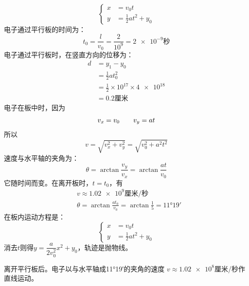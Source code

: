 ~\vspace{-1em}
\begin{equation*}
    \left\lbrace \begin{aligned}
        x & =v_0 t               \\
        y & =\frac{1}{2}at^2+y_0
    \end{aligned}\right.
\end{equation*}
电子通过平行板的时间为：
\begin{equation*}
    t_0=\frac{l}{v_0}=\frac{2}{10^{9}}=\num{2e-9}\text{秒}
\end{equation*}
电子通过平行板时，在竖直方向的位移为：
\begin{align*}
    d & =y_1-y_0                                     \\
      & =\frac{1}{2}at_0^2                           \\
      & =\frac{1}{2}\times 10^{17} \times \num{4e18} \\
      & =0.2\text{厘米}
\end{align*}
电子在板中时，因为\vspace{-0.5em}
\begin{equation*}
    v_x=v_0 \qquad v_y=at \\
\end{equation*}
所以\vspace{-1em}
\begin{equation*}
    v=\sqrt{v_x^2+v_y^2}=\sqrt{v_0^2 + a^2 t^2}
\end{equation*}
速度与水平轴的夹角为：
\begin{equation*}
    \theta = \arctan\frac{v_y}{v_x} = \arctan\frac{at}{v_0}
\end{equation*}
它随时间而变。在离开板时，$t=t_0$，有
\begin{align*}
     & v \approx \num{1.02e9}\text{厘米/秒}                           \\
     & \theta = \arctan\frac{at_0}{v_0} =\arctan\frac 1 5=\ang{11;19;}
\end{align*}
在板内运动方程是：
\begin{equation*}
    \left\lbrace \begin{aligned}
        x & =v_0 t               \\
        y & =\frac{1}{2}at^2+y_0
    \end{aligned}\right.
\end{equation*}
消去$t$则得$y=\dfrac{a}{2v_0^2}x^2+y_0$，轨迹是抛物线。

离开平行板后。电子以与水平轴成\ang{11;19;}的夹角的速度
$v\approx\num{1.02e8}$厘米/秒作直线运动。

